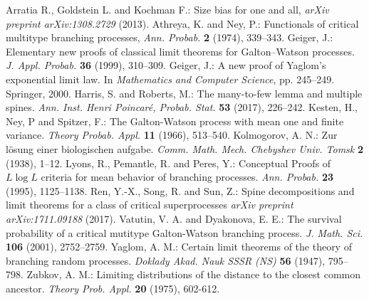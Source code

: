 \documentclass[12pt,a4paper]{amsart}
\numberwithin{equation}{section}
\begin{document}
\vspace{.1in}
\begin{thebibliography}{99}
	Arratia R., Goldstein L. and Kochman F.:
	Size bias for one and all,
	{\it arXiv preprint arXiv:1308.2729}
	(2013).
	Athreya, K.  and  Ney, P.: 
	Functionals of critical multitype branching processes, 
	{\it Ann. Probab.} 
	{\bf 2} (1974), 339--343.
	Geiger, J.:
	Elementary new proofs of classical limit theorems for Galton--Watson processes.
	{\it J. Appl. Probab.} 
	\textbf{36} (1999), 310--309.
	Geiger, J.:
	A new proof of Yaglom's exponential limit law.
	In {\it Mathematics and Computer Science}, 
	pp. 245--249. Springer, 2000.
	Harris, S. and Roberts, M.:
	The many-to-few lemma and multiple spines.
	{\it Ann.  Inst. Henri Poincar{\'e}, Probab. Stat.}
	\textbf{53} (2017), 226--242.
	Kesten, H.,  Ney, P and Spitzer, F.:
	The Galton-Watson process with mean one and finite variance.
	{\it Theory Probab. Appl.}
	\textbf{11} (1966), 513--540.
	Kolmogorov, A. N.:
	Zur l{\"o}sung einer biologischen aufgabe.
	{\it Comm. Math. Mech. Chebyshev Univ. Tomsk}
	\textbf{2} (1938), 1--12.
	Lyons, R.,  Pemantle, R. and Peres, Y.:
	Conceptual Proofs of $ L \log L $ criteria for mean behavior of branching processes.
	{\it Ann. Probab.} \textbf{23} (1995), 1125--1138.
	Ren, Y.-X., Song, R. and Sun, Z.:
	Spine decompositions and limit theorems for a class of critical superprocesses
	{\it arXiv preprint arXiv:1711.09188}
	(2017).
	Vatutin, V. A. and Dyakonova,  E. E.: 
	The survival probability of a critical mutitype Galton-Watson branching process. 
	{\it J.  Math. Sci.} 
	\textbf{106} (2001), 2752--2759.
	Yaglom, A. M.:
	Certain limit theorems of the theory of branching random processes.
	{\it Doklady Akad. Nauk SSSR (NS)} 
	\textbf{56} (1947), 795--798.
	Zubkov, A. M.:
	Limiting distributions of the distance to the closest common ancestor. 
	{\it Theory Prob. Appl.}
	\textbf{20} (1975), 602-612.

\end{thebibliography}
\end{document}
